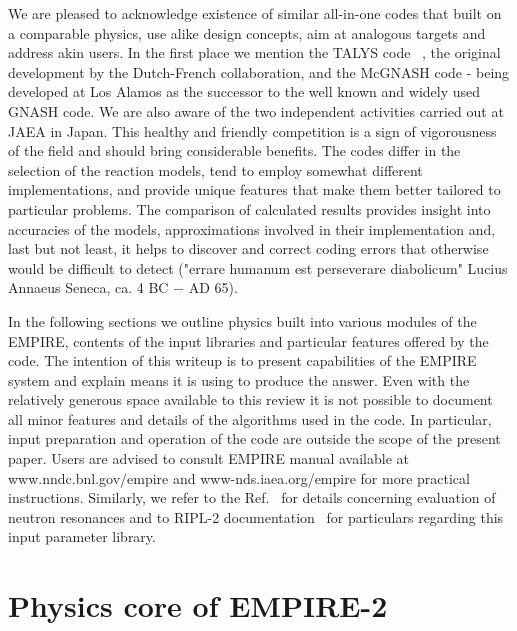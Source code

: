 We are pleased to acknowledge existence of similar all-in-one codes that
built on a comparable physics, use alike design concepts, aim at analogous
targets and address akin users. In the first place we mention the TALYS code~%
\cite{TALYS}, the original development by the Dutch-French collaboration,
and the McGNASH code - being developed at Los Alamos as the successor to the
well known and widely used GNASH code. We are also aware of the two
independent activities carried out at JAEA in Japan. This healthy and
friendly competition is a sign of vigorousness of the field and should bring
considerable benefits. The codes differ in the selection of the reaction
models, tend to employ somewhat different implementations, and provide
unique features that make them better tailored to particular problems. The
comparison of calculated results provides insight into accuracies of the
models, approximations involved in their implementation and, last but not
least, it helps to discover and correct coding errors that otherwise would
be difficult to detect ("errare humanum est perseverare diabolicum" Lucius
Annaeus Seneca, ca. 4 BC $-$ AD 65).

In the following sections we outline physics built into various modules of
the EMPIRE, contents of the input libraries and particular features offered
by the code. The intention of this writeup is to present capabilities of the
EMPIRE system and explain means it is using to produce the answer. Even with
the relatively generous space available to this review it is not possible to
document all minor features and details of the algorithms used in the code.
In particular, input preparation and operation of the code are outside the
scope of the present paper. Users are advised to consult EMPIRE manual
available at www.nndc.bnl.gov/empire and www-nds.iaea.org/empire for more
practical instructions. Similarly, we refer to the Ref.~\cite{Mughabghab:06}
for details concerning evaluation of neutron resonances and to RIPL-2
documentation~\cite{RIPL-2} for particulars regarding this input parameter
library.

\section{Physics core of EMPIRE-2}

